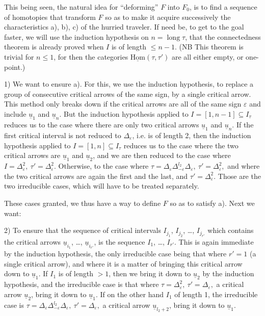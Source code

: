 \documentclass[11pt]{article}
\newcommand{\printedpage}[1]{\marginpar{\footnotesize p.~#1}}
\newcommand{\msp}[1]{\marginpar{\footnotesize [#1]}}
\newcommand{\uHom}{\underline{\mathrm{Hom}}}
\newcommand{\ul}[1]{\underline{#1}}
\begin{document}
\msp{page 89}
This being seen, the natural idea for ``deforming'' $F$ into $F_0$, is to find a sequence of homotopies that transform $F$ so as to make it acquire successively the characteristics a), b), c) of the hurried traveler. If need be, to get to the goal faster, we will use the induction hypothesis on $n=\operatorname{long}\tau$, that the connectedness theorem is already proved when $I$ is of length $\leq n-1$. (NB This theorem is trivial for $n\leq1$, for then the categories $\uHom(\tau,\tau')$ are all either empty, or one-point.)

\msp{page 90}
1) We want to ensure a). For this, we use the induction hypothesis, to replace a group of consecutive critical arrows of the same sign, by a single critical arrow. This method only breaks down if the critical arrows are all of the same sign $\varepsilon$ and include $\ul{u}_1$ and $\ul{u}_n$. But the induction hypothesis applied to $I=[1,n-1]\subseteq I_\tau$ reduces us to the case where there are only two critical arrows $\ul{u}_1$ and $\ul{u}_n$. If the first critical interval is not reduced to $\Delta_\varepsilon$, i.e. is of length 2, then the induction hypothesis applied to $I=[1,n]\subseteq I_\tau$ reduces us to the case where the two critical arrows are $\ul{u}_1$ and $\ul{u}_2$, and we are
\printedpage{58}
\msp{page 91}
then reduced to the case where $\boxed{I=\Delta^2_\varepsilon,\ \tau'=\Delta^2_\varepsilon.}$ Otherwise, to the case where $\boxed{\tau=\Delta_\varepsilon\Delta^{l_2}_{-\varepsilon}\Delta_\varepsilon,\ \tau'=\Delta^2_\varepsilon,}$ and where the two critical arrows are again the first and the last, and $\tau'=\Delta^2_\varepsilon$. Those are the two irreducible cases, which will have to be treated separately.

These cases granted, we thus have a way to define $F$ so as to satisfy a). Next we want:

2) To ensure that the sequence of critical intervals $I_{j_1}$, $I_{j_2}$, \dots, $I_{j_{r'}}$ which contains the critical arrows $\ul{u}_{i_1}$, \dots, $\ul{u}_{i_{r'}}$, is the sequence $I_1$, \dots, $I_{r'}$. This is again immediate by the induction hypothesis, the only irreducible case being that where $r'=1$ (a single critical arrow), and where it is a matter of bringing this critical arrow down to $\ul{u}_1$. If $I_1$ is of length $>1$, then we bring it down to $\ul{u}_2$ by the induction hypothesis, and the irreducible case is that where $\boxed{\tau=\Delta^2_\varepsilon,\ \tau'=\Delta_\varepsilon,}$ a critical arrow $\ul{u}_2$, bring it down to $\ul{u}_1$. If on the other hand $I_1$ of length 1, the irreducible case is $\boxed{\tau=\Delta_\varepsilon\Delta^{l_2}_{-\varepsilon}\Delta_\varepsilon,\ \tau'=\Delta_\varepsilon,}$ a critical arrow $\ul{u}_{l_2+2}$, bring it down to $\ul{u}_1$.
\end{document}
